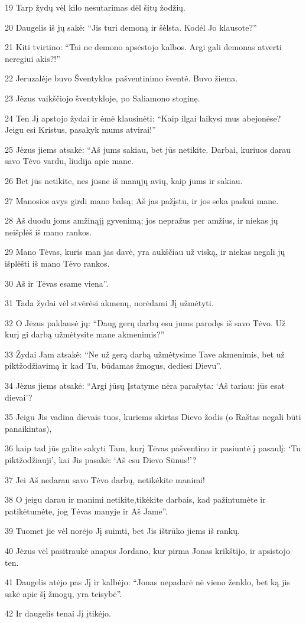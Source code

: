 \par 19 Tarp žydų vėl kilo nesutarimas dėl šitų žodžių. 
\par 20 Daugelis iš jų sakė: “Jis turi demoną ir šėlsta. Kodėl Jo klausote?” 
\par 21 Kiti tvirtino: “Tai ne demono apsėstojo kalbos. Argi gali demonas atverti neregiui akis?!” 
\par 22 Jeruzalėje buvo Šventyklos pašventinimo šventė. Buvo žiema. 
\par 23 Jėzus vaikščiojo šventykloje, po Saliamono stoginę. 
\par 24 Ten Jį apstojo žydai ir ėmė klausinėti: “Kaip ilgai laikysi mus abejonėse? Jeigu esi Kristus, pasakyk mums atvirai!” 
\par 25 Jėzus jiems atsakė: “Aš jums sakiau, bet jūs netikite. Darbai, kuriuos darau savo Tėvo vardu, liudija apie mane. 
\par 26 Bet jūs netikite, nes jūs­ne iš manųjų avių, kaip jums ir sakiau. 
\par 27 Manosios avys girdi mano balsą; Aš jas pažįstu, ir jos seka paskui mane. 
\par 28 Aš duodu joms amžinąjį gyvenimą; jos nepražus per amžius, ir niekas jų neišplėš iš mano rankos. 
\par 29 Mano Tėvas, kuris man jas davė, yra aukščiau už viską, ir niekas negali jų išplėšti iš mano Tėvo rankos. 
\par 30 Aš ir Tėvas esame viena”. 
\par 31 Tada žydai vėl stvėrėsi akmenų, norėdami Jį užmėtyti. 
\par 32 O Jėzus paklausė jų: “Daug gerų darbų esu jums parodęs iš savo Tėvo. Už kurį gi darbą užmėtysite mane akmenimis?” 
\par 33 Žydai Jam atsakė: “Ne už gerą darbą užmėtysime Tave akmenimis, bet už piktžodžiavimą ir kad Tu, būdamas žmogus, dediesi Dievu”. 
\par 34 Jėzus jiems atsakė: “Argi jūsų Įstatyme nėra parašyta: ‘Aš tariau: jūs esat dievai’? 
\par 35 Jeigu Jis vadina dievais tuos, kuriems skirtas Dievo žodis (o Raštas negali būti panaikintas), 
\par 36 kaip tad jūs galite sakyti Tam, kurį Tėvas pašventino ir pasiuntė į pasaulį: ‘Tu piktžodžiauji’, kai Jis pasakė: ‘Aš esu Dievo Sūnus!’? 
\par 37 Jei Aš nedarau savo Tėvo darbų,­ netikėkite manimi! 
\par 38 O jeigu darau ir manimi netikite,­tikėkite darbais, kad pažintumėte ir patikėtumėte, jog Tėvas manyje ir Aš Jame”. 
\par 39 Tuomet jie vėl norėjo Jį suimti, bet Jis ištrūko jiems iš rankų. 
\par 40 Jėzus vėl pasitraukė anapus Jordano, kur pirma Jonas krikštijo, ir apsistojo ten. 
\par 41 Daugelis atėjo pas Jį ir kalbėjo: “Jonas nepadarė nė vieno ženklo, bet ką jis sakė apie šį žmogų, yra teisybė”. 
\par 42 Ir daugelis tenai Jį įtikėjo.



